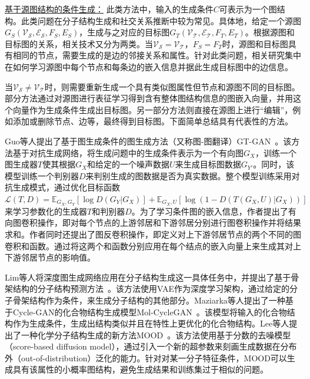 \documentclass[12pt,UTF8,AutoFakeBold=2,a4paper]{ctexart} %
\begin{document}
\underline{基于源图结构的条件生成：} 此类方法中，输入的生成条件$C$可表示为一个图结构。此类问题在分子结构生成和社交关系推断中较为常见。具体地，给定一个源图$G_S(\mathcal{V_S}, \mathcal{E_S}, F_S, E_S)$，生成与之对应的目标图$G_T(\mathcal{V_T}, \mathcal{E_T}, F_T, E_T)$。根据源图和目标图的关系，相关技术又分为两类。当$\mathcal{V_S} = \mathcal{V_T}$，$F_S = F_T$时，源图和目标图具有相同的节点，需要生成的是边的邻接关系和属性。针对此类问题，相关研究集中在如何学习源图中每个节点和每条边的嵌入信息并据此生成目标图中的边信息。

当$\mathcal{V_S} \ne \mathcal{V_T}$时，则需要重新生成一个具有类似图属性但节点和源图不同的目标图。部分方法通过对源图进行表征学习得到含有整体图结构信息的图嵌入向量，并用这个向量作为生成条件生成出目标图。另一部分方法则直接在源图上进行``编辑''，例如添加或删除节点、边等，最终得到目标图。下面简单总结具有代表性的方法。

Guo等人提出了基于图生成条件的图生成方法（又称图-图翻译）GT-GAN~\cite{guo2022deep}。该方法基于对抗生成网络，将生成问题中的生成条件表示为一个有向图$G_X$，训练一个图生成器$T$使其根据$G_X$和给定的一个噪声数据$U$来生成目标图数据$G_{Y'}$。同时，该模型训练一个判别器$D$来判别生成的图数据是否为真实数据。整个模型训练采用对抗生成模式，通过优化目标函数$\mathcal{L}(T,D) = \mathbb{E}_{G_X, G_Y}[\log D(G_Y|G_X)]+\mathbb{E}_{G_X,U}[\log (1-D(T(G_X,U)|G_X))]$来学习参数化的生成器$T$和判别器$D$。为了学习条件图的嵌入信息，作者提出了有向图卷积操作，即对每个节点的上游邻居和下游邻居分别进行图卷积操作并将结果求和。作者同时还提出了图反卷积操作，即定义对上下游邻居节点的两个不同的图卷积和函数。通过将这两个和函数分别应用在每个结点的嵌入向量上来生成其对上下游邻居节点的影响值。

Lim等人将深度图生成网络应用在分子结构生成这一具体任务中，并提出了基于骨架结构的分子结构预测方法~\cite{lim2020scaffold}。该方法使用VAE作为深度学习架构，通过给定的分子骨架结构作为条件，来生成分子结构的其他部分。Maziarka等人提出了一种基于Cycle-GAN的化合物结构生成模型Mol-CycleGAN~\cite{maziarka2020mol}。该模型将输入的化合物结构作为生成条件，生成出结构类似并且在特性上更优化的化合物结构。Lee等人提出了一种化学分子结构生成的新方法MOOD~\cite{lee2023exploring}。该方法使用基于分数的去噪模型（score-based diffusion model），通过引入一个新的超参数来刻画生成数据在分布外（out-of-distribution）泛化的能力。针对对某一分子特征条件，MOOD可以生成具有该属性的小概率图结构，避免生成结果和训练集过于相似的问题。

\end{document}

